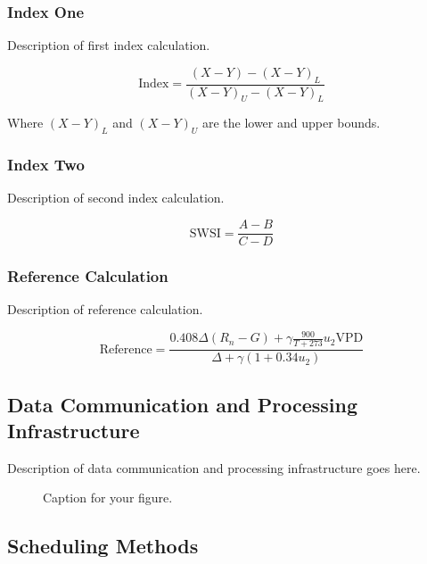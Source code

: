 \documentclass[12pt]{article}
\begin{document}
\subsubsection{Index One}

Description of first index calculation.

\begin{equation}
\text{Index} = \frac{(X - Y) - (X - Y)_L}{(X - Y)_U - (X - Y)_L}
\label{eq:index1}
\end{equation}

Where $(X - Y)_L$ and $(X - Y)_U$ are the lower and upper bounds.

\subsubsection{Index Two}

Description of second index calculation.

\begin{equation}
\text{SWSI} = \frac{A - B}{C - D}
\label{eq:index2}
\end{equation}

\subsubsection{Reference Calculation}

Description of reference calculation.

\begin{equation}
\text{Reference} = \frac{0.408\Delta (R_n - G) + \gamma \frac{900}{T + 273} u_2 \text{VPD}}{\Delta + \gamma (1 + 0.34 u_2)}
\label{eq:reference}
\end{equation}

\subsection{Data Communication and Processing Infrastructure}

Description of data communication and processing infrastructure goes here.

\begin{figure}[htbp]
    \centering
    \caption{Caption for your figure.}
    \label{fig:data-flow}
\end{figure}

\subsection{Scheduling Methods}
\end{document}

